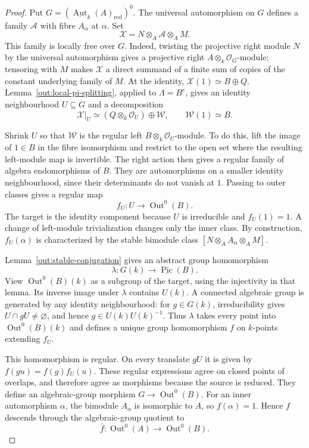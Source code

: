 \documentclass[12pt,a4paper,english,reqno]{amsart}
\numberwithin{equation}{section}
\theoremstyle{plain}
\theoremstyle{definition}
\begin{document}
\begin{proof}
Put $G=(\underline{\operatorname{Aut}}_k(A)_{\mathrm{red}})^0$.
The universal automorphism on $G$ defines a family $\mathcal A$
with fibre $A_\alpha$ at $\alpha$. Set
\[
 \mathcal X=N\otimes_A\mathcal A\otimes_AM.
\]
This family is locally free over $G$. Indeed, twisting the
projective right module $N$ by the universal automorphism gives
a projective right $A\otimes_k\mathcal O_G$-module; tensoring
with $M$ makes $\mathcal X$ a direct summand of a finite sum of
copies of the constant underlying family of $M$.
At the identity, $\mathcal X(1)\simeq B\oplus Q$.
Lemma~\ref{out:local-pi-splitting}, applied to $\Lambda=B^e$,
gives an identity neighbourhood $U\subseteq G$ and a decomposition
\[
 \mathcal X|_U\simeq
 (Q\otimes_k\mathcal O_U)\oplus\mathcal W,
 \qquad\mathcal W(1)\simeq B.
\]

Shrink $U$ so that $\mathcal W$ is the regular left
$B\otimes_k\mathcal O_U$-module. To do this, lift the image of
$1\in B$ in the fibre isomorphism and restrict to the open set
where the resulting left-module map is invertible.
The right action then gives a regular family of algebra
endomorphisms of $B$. They are automorphisms on a smaller
identity neighbourhood, since their determinants do not vanish
at $1$. Passing to outer classes gives a regular map
\[
 f_U:U\longrightarrow\operatorname{Out}^0(B).
\]
The target is the identity component because $U$ is irreducible
and $f_U(1)=1$. A change of left-module trivialization changes
only the inner class. By construction, $f_U(\alpha)$ is
characterized by the stable bimodule class
$[N\otimes_AA_\alpha\otimes_AM]$.

Lemma~\ref{out:stable-conjugation} gives an abstract group
homomorphism
\[
 \lambda:G(k)\longrightarrow\underline{\operatorname{Pic}}(B).
\]
View $\operatorname{Out}^0(B)(k)$ as a subgroup of the target,
using the injectivity in that lemma. Its inverse image under
$\lambda$ contains $U(k)$. A connected algebraic group is
generated by any identity neighbourhood: for $g\in G(k)$,
irreducibility gives $U\cap gU\ne\varnothing$, and hence
$g\in U(k)U(k)^{-1}$. Thus $\lambda$ takes every point into
$\operatorname{Out}^0(B)(k)$ and defines a unique group
homomorphism $f$ on $k$-points extending $f_U$.

This homomorphism is regular. On every translate $gU$ it is
given by $f(gu)=f(g)f_U(u)$. These regular expressions agree on
closed points of overlaps, and therefore agree as morphisms
because the source is reduced. They define an algebraic-group
morphism $G\to\operatorname{Out}^0(B)$. For an inner
automorphism $\alpha$, the bimodule $A_\alpha$ is isomorphic
to $A$, so $f(\alpha)=1$. Hence $f$ descends through the
algebraic-group quotient to
\[
 \bar f:\operatorname{Out}^0(A)\longrightarrow
             \operatorname{Out}^0(B).
\]


\end{proof}
\end{document}
